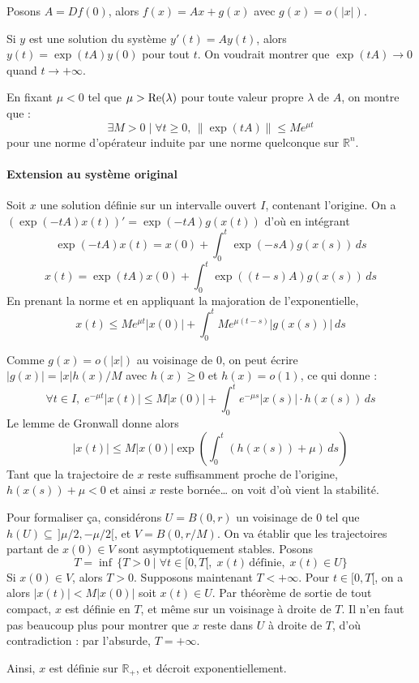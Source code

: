 \documentclass[a4paper, 11pt]{article}
\def\R{\mathbb{R}}
\def\Re{\textnormal{Re}}
\begin{document}
Posons $A = Df(0)$, alors $f(x) = Ax + g(x)$ avec $g(x) = o(|x|)$.

Si $y$ est une solution du système $y'(t) = Ay(t)$, alors $y(t) = \exp(tA)y(0)$
pour tout $t$. On voudrait montrer que $\exp(tA) \to 0$ quand $t \to +\infty$.

En fixant $\mu < 0$ tel que $\mu > \Re(\lambda)$ pour toute valeur propre
$\lambda$ de $A$, on montre que :
\[ \exists M > 0 \mid \forall t \geq 0,\, \|\exp(tA)\| \leq M e^{\mu t} \]
pour une norme d'opérateur induite par une norme quelconque sur $\R^n$.

\paragraph{Extension au système original}

Soit $x$ une solution définie sur un intervalle ouvert $I$, contenant l'origine.
On a $(\exp(-tA)x(t))' = \exp(-tA)g(x(t))$ d'où en intégrant
\[ \exp(-tA)x(t) = x(0) + \int_0^t \exp(-sA)g(x(s))\,ds \]
\[ x(t) = \exp(tA)x(0) + \int_0^t \exp((t-s)A)g(x(s))\,ds \]
En prenant la norme et en appliquant la majoration de l'exponentielle,
\[ x(t) \leq M e^{\mu t}|x(0)| + \int_0^t M e^{\mu(t-s)}|g(x(s))|\,ds \]

Comme $g(x) = o(|x|)$ au voisinage de 0, on peut écrire $|g(x)| = |x|
h(x) / M$ avec $h(x) \geq 0$ et $h(x) = o(1)$, ce qui donne :
\[ \forall t \in I,\; e^{-\mu t}|x(t)| \leq M |x(0)| + 
   \int_0^t e^{-\mu s}|x(s)| \cdot h(x(s)) \,ds \]
Le lemme de Gronwall donne alors
\[ |x(t)| \leq M|x(0)| \exp\left(\int_0^t (h(x(s)) + \mu) \,ds\right) \]
Tant que la trajectoire de $x$ reste suffisamment proche de l'origine, $h(x(s))
+ \mu < 0$ et ainsi $x$ reste bornée… on voit d'où vient la stabilité.

Pour formaliser ça, considérons $U = B(0,r)$ un voisinage de $0$ tel que
$h(U) \subseteq\, ]\mu/2, -\mu/2[$, et $V = B(0,r/M)$. On va établir que les
trajectoires partant de $x(0) \in V$ sont asymptotiquement stables. Posons
\[ T = \inf\, \{ T > 0 \mid \forall t \in [0, T[,\; x(t)\,\text{définie},\;
  x(t) \in U \} \]
Si $x(0) \in V$, alors $T > 0$. Supposons maintenant $T < +\infty$. Pour $t \in
[0,T[$, on a alors $|x(t)| < M|x(0)|$ soit $x(t) \in U$. Par théorème de
sortie de tout compact, $x$ est définie en $T$, et même sur un voisinage à
droite de $T$. Il n'en faut pas beaucoup plus pour montrer que $x$ reste dans
$U$ à droite de $T$, d'où contradiction : par l'absurde, $T = +\infty$.

Ainsi, $x$ est définie sur $\R_+$, et décroit exponentiellement.
\end{document}
